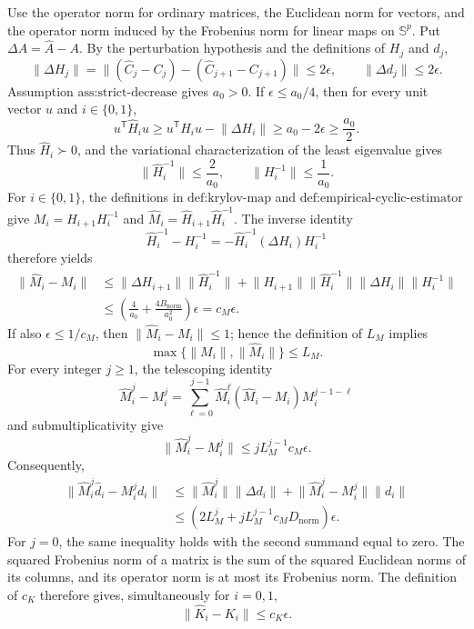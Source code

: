 Use the operator norm for ordinary matrices, the Euclidean norm for vectors, and the operator norm induced by the Frobenius norm for linear maps on \(\mathbb S^p\).  Put \(\Delta A=\widehat A-A\).  By the perturbation hypothesis and the definitions of \(H_j\) and \(d_j\),
\[
 \lVert\Delta H_j\rVert
 =\lVert(\widehat C_j-C_j)-(\widehat C_{j+1}-C_{j+1})\rVert
 \le 2\epsilon,
 \qquad
 \lVert\Delta d_j\rVert
 \le 2\epsilon.
\]
Assumption \(\text{ass:strict-decrease}\) gives \(a_0>0\).  If \(\epsilon\le a_0/4\), then for every unit vector \(u\) and \(i\in\{0,1\}\),
\[
 u^{\mathsf T}\widehat H_i u
 \ge u^{\mathsf T}H_i u-\lVert\Delta H_i\rVert
 \ge a_0-2\epsilon
 \ge \frac{a_0}{2}.
\]
Thus \(\widehat H_i\succ0\), and the variational characterization of the least eigenvalue gives
\[
 \lVert\widehat H_i^{-1}\rVert\le \frac{2}{a_0},
 \qquad
 \lVert H_i^{-1}\rVert\le \frac{1}{a_0}.
\]
For \(i\in\{0,1\}\), the definitions in \(\text{def:krylov-map}\) and \(\text{def:empirical-cyclic-estimator}\) give \(M_i=H_{i+1}H_i^{-1}\) and \(\widehat M_i=\widehat H_{i+1}\widehat H_i^{-1}\).  The inverse identity
\[
 \widehat H_i^{-1}-H_i^{-1}
 =-\widehat H_i^{-1}(\Delta H_i)H_i^{-1}
\]
therefore yields
\[
 \begin{aligned}
 \lVert\widehat M_i-M_i\rVert
 &\le \lVert\Delta H_{i+1}\rVert\lVert\widehat H_i^{-1}\rVert
 +\lVert H_{i+1}\rVert\lVert\widehat H_i^{-1}\rVert
   \lVert\Delta H_i\rVert\lVert H_i^{-1}\rVert\\
 &\le \left(\frac{4}{a_0}+\frac{4B_{\mathrm{norm}}}{a_0^2}\right)\epsilon
 =c_M\epsilon.
 \end{aligned}
\]
If also \(\epsilon\le1/c_M\), then \(\lVert\widehat M_i-M_i\rVert\le1\); hence the definition of \(L_M\) implies
\[
 \max\{\lVert M_i\rVert,\lVert\widehat M_i\rVert\}\le L_M.
\]
For every integer \(j\ge1\), the telescoping identity
\[
 \widehat M_i^j-M_i^j
 =\sum_{\ell=0}^{j-1}\widehat M_i^\ell
   (\widehat M_i-M_i)M_i^{j-1-\ell}
\]
and submultiplicativity give
\[
 \lVert\widehat M_i^j-M_i^j\rVert
 \le jL_M^{j-1}c_M\epsilon.
\]
Consequently,
\[
 \begin{aligned}
 \lVert\widehat M_i^j\widehat d_i-M_i^jd_i\rVert
 &\le \lVert\widehat M_i^j\rVert\lVert\Delta d_i\rVert
 +\lVert\widehat M_i^j-M_i^j\rVert\lVert d_i\rVert\\
 &\le \left(2L_M^j+jL_M^{j-1}c_MD_{\mathrm{norm}}\right)\epsilon.
 \end{aligned}
\]
For \(j=0\), the same inequality holds with the second summand equal to zero.  The squared Frobenius norm of a matrix is the sum of the squared Euclidean norms of its columns, and its operator norm is at most its Frobenius norm.  The definition of \(c_K\) therefore gives, simultaneously for \(i=0,1\),
\[
 \lVert\widehat K_i-K_i\rVert\le c_K\epsilon.
\]

